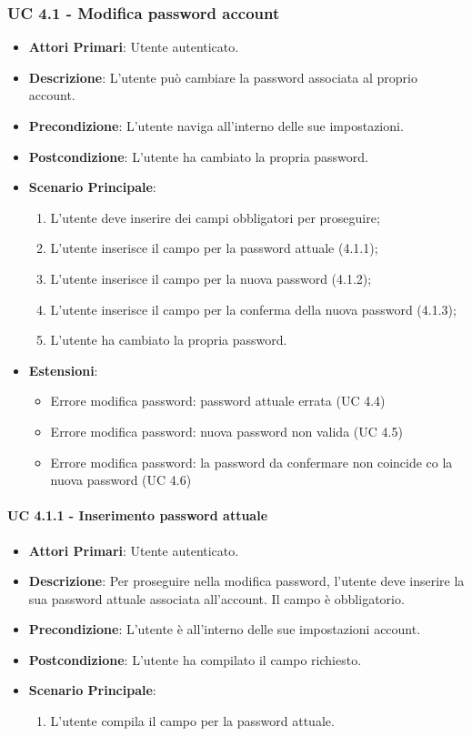 			\subsubsection{UC 4.1 - Modifica password account}
			\begin{itemize}
				\item \textbf{Attori Primari}: Utente autenticato.
				\item \textbf{Descrizione}: L'utente può cambiare la password associata al proprio account.
				\item \textbf{Precondizione}: L'utente naviga all'interno delle sue impostazioni.
				\item \textbf{Postcondizione}: L'utente ha cambiato la propria password.
				\item \textbf{Scenario Principale}:
				\begin{enumerate}
					\item L'utente deve inserire dei campi obbligatori per proseguire;
					\item L'utente inserisce il campo per la password attuale (4.1.1);
					\item L'utente inserisce il campo per la nuova password (4.1.2);
					\item L'utente inserisce il campo per la conferma della nuova password (4.1.3);
					\item L'utente ha cambiato la propria password.
				\end{enumerate}	
				\item \textbf{Estensioni}:
					\begin{itemize}
						\item Errore modifica password: password attuale errata (UC 4.4)
						\item Errore modifica password: nuova password non valida (UC 4.5)
						\item Errore modifica password: la password da confermare non coincide co la nuova password (UC 4.6)
					\end{itemize}
			\end{itemize}

				\paragraph{UC 4.1.1 - Inserimento password attuale}
				\begin{itemize}
					\item \textbf{Attori Primari}: Utente autenticato.
					\item \textbf{Descrizione}: Per proseguire nella modifica password, l'utente deve inserire la sua password attuale associata all'account. Il campo è obbligatorio.
					\item \textbf{Precondizione}: L'utente è all'interno delle sue impostazioni account.
					\item \textbf{Postcondizione}: L'utente ha compilato il campo richiesto.
					\item \textbf{Scenario Principale}:
					\begin{enumerate}
						\item L'utente compila il campo per la password attuale.
					\end{enumerate}
				\end{itemize}


